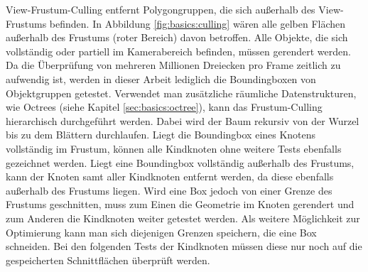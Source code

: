 View-Frustum-Culling entfernt Polygongruppen, die sich außerhalb des View-Frustums befinden. In Abbildung \ref{fig:basics:culling} wären alle gelben Flächen außerhalb des Frustums (roter Bereich) davon betroffen. Alle Objekte, die sich vollständig oder partiell im Kamerabereich befinden, müssen gerendert werden. Da die Überprüfung von mehreren Millionen Dreiecken pro Frame zeitlich zu aufwendig ist, werden in dieser Arbeit lediglich die Boundingboxen von Objektgruppen getestet. Verwendet man zusätzliche räumliche Datenstrukturen, wie Octrees (siehe Kapitel \ref{sec:basics:octree}), kann das Frustum-Culling hierarchisch durchgeführt werden. Dabei wird der Baum rekursiv von der Wurzel bis zu dem Blättern durchlaufen. Liegt die Boundingbox eines Knotens vollständig im Frustum, können alle Kindknoten ohne weitere Tests ebenfalls gezeichnet werden. Liegt eine Boundingbox vollständig außerhalb des Frustums, kann der Knoten samt aller Kindknoten entfernt werden, da diese ebenfalls außerhalb des Frustums liegen. Wird eine Box jedoch von einer Grenze des Frustums geschnitten, muss zum Einen die Geometrie im Knoten gerendert und zum Anderen die Kindknoten weiter getestet werden. Als weitere Möglichkeit zur Optimierung kann man sich diejenigen Grenzen speichern, die eine Box schneiden. Bei den folgenden Tests der Kindknoten müssen diese nur noch auf die gespeicherten Schnittflächen überprüft werden.\\
